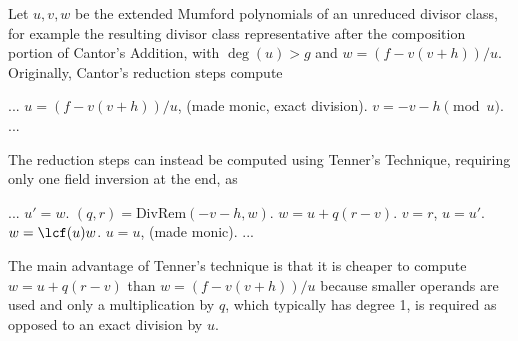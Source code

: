 Let $u,v,w$ be the extended Mumford polynomials of an unreduced divisor class,
for example the resulting divisor class representative after the composition
portion of Cantor's Addition, with $\deg(u) > g$ and $w = (f - v(v + h))/u$.
Originally, Cantor's reduction steps compute 
\begin{center}
    \begin{minipage}{0.75\textwidth} 
    \begin{algorithm}[H]\label{alg:origred}
        \centering
        \begin{algorithmic}[1]
        \vspace{5pt}
        \Statex ...
            \State $u = (f-v(v + h))/u$, (made monic, exact division). 
            \State $v = -v-h \pmod{u}$.
        \EndWhile
        \vspace{-6pt}
        \Statex ...
        \vspace{1pt}
        \end{algorithmic}
    \end{algorithm}
    \end{minipage}
\end{center}
The reduction steps can instead be computed using Tenner's Technique,
requiring only one field inversion at the end, as
\begin{center}
    \begin{minipage}{0.75\textwidth} 
    \begin{algorithm}[H]\label{alg:improvedred}
        \centering
        \begin{algorithmic}[1]
        \vspace{5pt}
        \Statex ...
            \State $u' = w$.
            \State $(q,r) = \mathrm{DivRem}(-v - h,w)$.
            \State $w = u + q(r - v)$.
            \State $v = r$, $u = u'$. 
        \EndWhile
        \State $w = \lcf(u)w$.
        \State $u = u$, (made monic).
        \vspace{-6pt}
        \Statex ...
        \vspace{1pt}
        \end{algorithmic}
    \end{algorithm}
    \end{minipage}
\end{center}
The main advantage of Tenner's technique is that it is cheaper to
compute $w = u + q(r-v)$ than $w = (f - v(v + h))/u$ because smaller operands
are used and only a multiplication by $q$, which typically has degree 1, is
required as opposed to an exact division by $u$.

